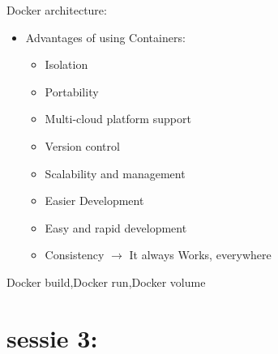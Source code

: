 \documentclass[12pt]{article}
\begin{document}
Docker architecture:
\begin{itemize}
    \item Advantages of using Containers:\begin{itemize}
        \item Isolation 
        \item Portability 
        \item Multi-cloud platform support 
        \item Version control 
        \item Scalability and management 
        \item Easier Development 
        \item Easy and rapid development 
        \item Consistency $\rightarrow$ It always Works, everywhere
    \end{itemize}
\end{itemize}
Docker build,Docker run,Docker volume
\section{sessie 3:}
\end{document}
